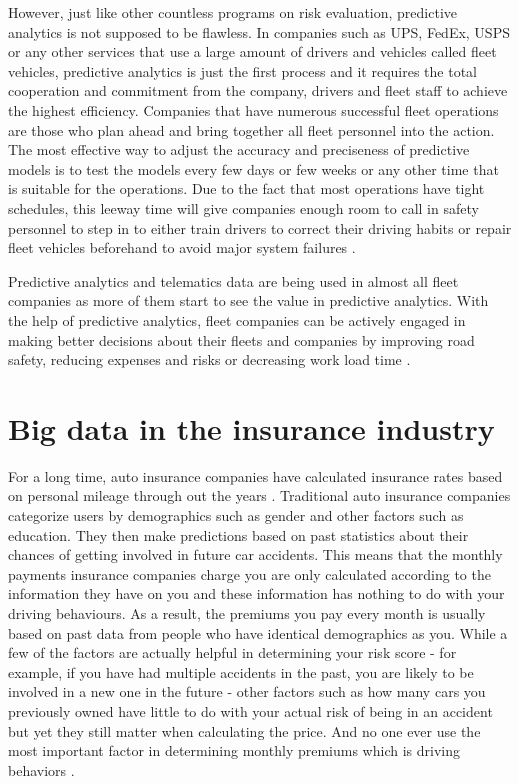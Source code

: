 However, just like other countless programs on risk evaluation, predictive analytics is not supposed to be flawless. In companies such as UPS, FedEx, USPS or any other services that use a large amount of drivers and vehicles called fleet vehicles, predictive analytics is just the first process and it requires the total cooperation and commitment from the company, drivers and fleet staff to achieve the highest efficiency. Companies that have numerous successful fleet operations are those who plan ahead and bring together all fleet personnel into the action. The most effective way to adjust the accuracy and preciseness of predictive models is to test the models every few days or few weeks or any other time that is suitable for the operations. Due to the fact that most operations have tight schedules, this leeway time will give companies enough room to call in safety personnel to step in to either train drivers to correct their driving habits or repair fleet vehicles beforehand to avoid major system failures \cite{Suizo2015decisions}.

Predictive analytics and telematics data are being used in almost all fleet companies as more of them start to see the value in predictive analytics. With the help of predictive analytics, fleet companies can be actively engaged in making better decisions about their fleets and companies by improving road safety, reducing expenses and risks or decreasing work load time \cite{Suizo2015decisions}.

\section{Big data in the insurance industry}

For a long time, auto insurance companies have calculated insurance rates based on personal mileage through out the years \cite{Fung2016turn}. Traditional auto insurance companies categorize users by demographics such as gender and other factors such as education. They then make predictions based on past statistics about their chances of getting involved in future car accidents. This means that the monthly payments insurance companies charge you are only calculated according to the information they have on you and these information has nothing to do with your driving behaviours. As a result, the premiums you pay every month is usually based on past data from people who have identical demographics as you. While a few of the factors are actually helpful in determining your risk score - for example, if you have had multiple accidents in the past, you are likely to be involved in a new one in the future - other factors such as how many cars you previously owned have little to do with your actual risk of being in an accident but yet they still matter when calculating the price. And no one ever use the most important factor in determining monthly premiums which is driving behaviors \cite{Rippe2017unfair}.

